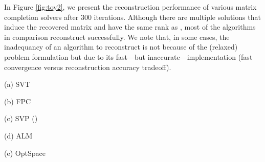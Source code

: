 \documentclass[twocolumn]{svjour3}
\begin{document}
In Figure \ref{fig:toy2}, we present the reconstruction performance of various matrix completion solvers after 300 iterations. Although there are multiple solutions that induce the recovered matrix and have the same rank as , most of the algorithms in comparison reconstruct  successfully. We note that, in some cases, the inadequancy of an algorithm to reconstruct  is not because of the (relaxed) problem formulation but due to its fast---but inaccurate---implementation (fast convergence versus reconstruction accuracy tradeoff).

\begin{figure*}[ht]
\hspace{1.5cm}\begin{minipage}[c]{0.15\linewidth}
\centering
 \hspace{-1.1cm} (a) SVT
\end{minipage}
\hspace{0.4cm}
\begin{minipage}[c]{0.15\linewidth}
\centering
 \hspace{-1.1cm} (b) FPC
\end{minipage}
\hspace{0.4cm}
\begin{minipage}[c]{0.15\linewidth}
\centering
 \hspace{-1.1cm} (c) SVP ()
\end{minipage}
\hspace{0.4cm}
\begin{minipage}[c]{0.15\linewidth}
\centering
 \hspace{-1.1cm} (d) ALM
\end{minipage}
\hspace{0.4cm}
\begin{minipage}[c]{0.15\linewidth}
\centering
 \hspace{-1.1cm} (e) OptSpace
\end{minipage} 
\\


\end{figure*}
\end{document}
